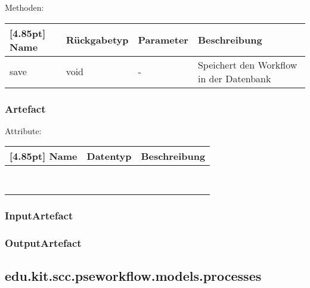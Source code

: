 		Methoden:
		\begin{center}
		    \setlength\tabcolsep{5pt}
        	\renewcommand{\arraystretch}{1.5}
            	\begin{tabularx}{\textwidth}{|l|l|l|X|}
            	\hline
            	\rowcolor[gray]{0.75}[4.85pt]
        		Name & Rückgabetyp & Parameter & Beschreibung \\ \hline 
                save & void & - & Speichert den Workflow in der Datenbank \\ \hline
            	\end{tabularx}
		\end{center}
    	
    	\subsubsection{Artefact}
    	
    	Attribute:
		\begin{center}
        	\renewcommand{\arraystretch}{1.5}
            \setlength\tabcolsep{5pt}
        	\begin{tabularx}{\textwidth}{|l|l|X|}
        		\hline
                \rowcolor[gray]{0.75}[4.85pt]            		
        	    Name & Datentyp & Beschreibung \\ \hline
        	    & & \\ \hline
        	    & & \\ \hline
        	    & & \\ \hline
        	    & & \\ \hline
        	    & & \\ \hline
        	    & & \\ \hline
        	    & & \\ \hline
        	    & & \\ \hline
        	\end{tabularx}
        \end{center}
    	
    	\subsubsection{InputArtefact}
    	
    	\subsubsection{OutputArtefact}

    \subsection{edu.kit.scc.pseworkflow.models.processes}
    
